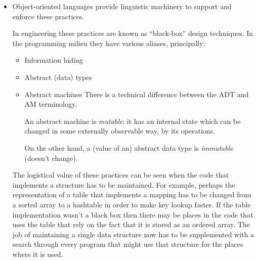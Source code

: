 \documentclass{ip3}
\begin{document}
\begin{foil}
\begin{itemize}
\item[] Object-oriented languages provide linguistic machinery to support and enforce these practices.
      \begin{note}
      In engineering these practices are known as ``black-box'' design techniques. 
      In the programming milieu they have various aliases, principally:
      \begin{itemize}
              \item[] Information hiding
              \item[] Abstract (data) types
              \item[] Abstract machines
              There is a technical difference between the ADT and  AM terminology.
              \par
              An abstract machine is \textit{mutable}: it has an internal
              state which can be changed in some externally observable
              way, by its operations.
              \par
              On the other hand, a (value of an) abstract data type
              is \textit{immutable} (doesn't change). 
      \end{itemize}
      \par      
      The logistical value of these practices can be seen when the code
      that implements a structure has to be maintained. For example,
      perhaps the representation of a table that implements a mapping
      has to be changed from a sorted array to a hashtable in order to
      make key lookup faster. If the table implementation wasn't a black
      box then there may be places in the code that uses the table that
      rely on the fact that it is stored as an ordered array. The job
      of maintaining a single data structure now has to be supplemented
      with a search through every program that might use that structure
      for the places where it is used.      
      \end{note}
\end{itemize}
\end{foil}
\end{document}
